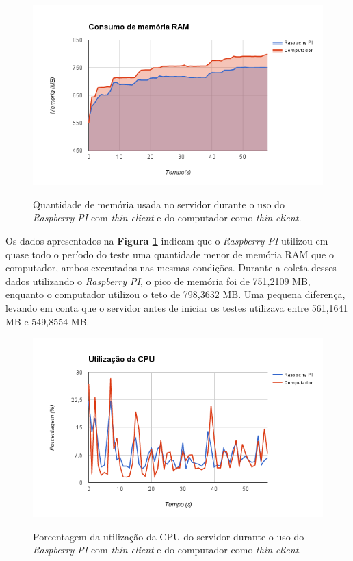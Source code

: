 \documentclass[
	12pt,				%
	openright,			%
	twoside,			%
	a4paper,			%
	chapter=TITLE,		%
	english,			%
	brazil				%
	]{abntex2}
\begin{document}
\begin{figure}[!htb]
\centering
\caption{Quantidade de memória usada no servidor durante o uso do \textit{Raspberry PI} com \textit{thin client} e do computador como \textit{thin client.}}
\includegraphics[scale=0.8]{Imagens/memoria}
\label{fig:memoria}
\end{figure}


Os dados apresentados na \textbf{Figura \ref{fig:memoria}} indicam que o \textit{Raspberry PI} utilizou em quase todo o período do teste uma quantidade menor de memória RAM que o computador, ambos executados nas mesmas condições. Durante a coleta desses dados utilizando o \textit{Raspberry PI}, o pico de memória foi de 751,2109 MB, enquanto o computador utilizou o teto de 798,3632 MB. Uma pequena diferença, levando em conta que o servidor antes de iniciar os testes utilizava entre 561,1641 MB e 549,8554 MB. 

\begin{figure}[!htb]
\centering
\caption{Porcentagem da utilização da CPU do servidor durante o uso do \textit{Raspberry PI} com \textit{thin client} e do computador como \textit{thin client}.}
\includegraphics[scale=0.8]{Imagens/cpu}
\label{fig:cpu}
\end{figure}
\end{document}
